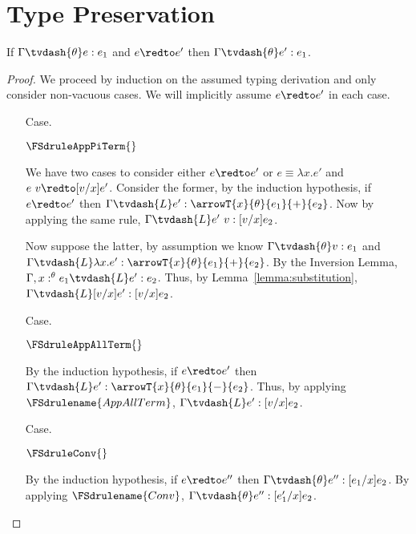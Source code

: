 \section{Type Preservation}
\label{sec:type_preservation}

\begin{thm}[Preservation]
  \label{thm:preservation}
  If $\Gamma \tvdash{\theta} e:e_1$ and $e \redto e'$ then $\Gamma \tvdash{\theta} e':e_1$.
\end{thm}
\begin{proof}
  We proceed by induction on the assumed typing derivation and only consider non-vacuous 
  cases.  We will implicitly assume $e \redto e'$ in each case.

  \begin{itemize}
  \item[Case.]\ \\
    \begin{center}
      $\FSdruleAppPiTerm{}$
    \end{center}
    We have two cases to consider either $e \redto e'$ or $e \equiv \lambda x.e'$
    and $e\ v \redto [v/x]e'$.  Consider the former, by the induction hypothesis, if 
    $e \redto e'$ then 
    $\Gamma \tvdash{L} e':\arrowT{x}{\theta}{e_1}{+}{e_2}$.  Now by applying the same
    rule, $\Gamma \tvdash{L} e'\ v:[v/x]e_2$.
    
    \noindent
    Now suppose the latter, by assumption we know $\Gamma \tvdash{\theta} v:e_1$ and
    $\Gamma \tvdash{L} \lambda x.e':\arrowT{x}{\theta}{e_1}{+}{e_2}$. By the Inversion Lemma, 
    $\Gamma,x:^\theta e_1 \tvdash{L} e':e_2$.  Thus, by Lemma~\ref{lemma:substitution},
    $\Gamma \tvdash{L}[v/x]e':[v/x]e_2$.

  \item[Case.]\ \\
    \begin{center}
      $\FSdruleAppAllTerm{}$
    \end{center}
    By the induction hypothesis, if $e \redto e'$ then 
    $\Gamma \tvdash{L} e':\arrowT{x}{\theta}{e_1}{-}{e_2}$.  Thus, by applying 
    $\FSdrulename{AppAllTerm}$, $\Gamma \tvdash{L} e':[v/x]e_2$.
    
  \item[Case.]\ \\
    \begin{center}
      $\FSdruleConv{}$
    \end{center}
    By the induction hypothesis, if $e \redto e''$ then $\Gamma \tvdash{\theta} e'':[e_1/x]e_2$.
    By applying $\FSdrulename{Conv}$, $\Gamma \tvdash{\theta} e'':[e'_1/x]e_2$.


\end{itemize}
\end{proof}
